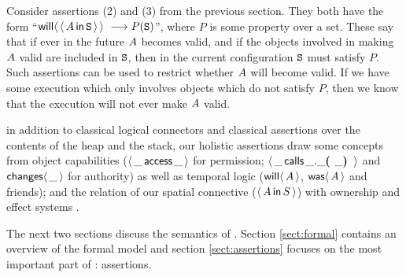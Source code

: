 Consider assertions (2) and (3) from the previous section. They
  both have the form ``$\Future {\Using {\A} {\SF}}\ \longrightarrow P(\SF)$'',
  where $P$ is some property over a set. These  say that if
  ever in the future $A$ becomes valid, and if the objects involved
  in making $A$ valid are included in ${{\mbox{\tt{S}}}}$, then in the current configuration ${{\mbox{\tt{S}}}}$ must satisfy
  $P$. Such assertions can be used to restrict whether $A$ will
  become valid. If we have some execution which only involves objects which do not satisfy $P$, then we know that the execution will not ever make $A$ valid.



 in addition to classical 
logical connectors and classical assertions over the contents of the heap and the stack, 
our holistic assertions draw some concepts from object capabilities
($\langle\, \_\, \mathsf{access}\, \_\, \rangle$  for  permission; $\langle\, \_\, \mathsf{calls}\, \_.\_{\mbox{\tt{\mbox{\tt{\bf{( }}}}}}\_{\mbox{\tt{\mbox{\tt{\bf{) }}}}}}\, \rangle$ and  ${\mathsf{changes}}\langle\,\_\,\rangle$ for
authority) 
as well as temporal logic (${\mathsf{will}}\langle \,A\,\rangle$, ${\mathsf{was}}\langle \,A\,\rangle$ and friends); and the relation of
our spatial connective ($\langle\, A\, \mathsf{in}\, S\, \rangle$)  with ownership and effect
systems \cite{typeEffect,ownalias,ownEncaps}.

The next two sections  discuss the semantics of \Chainmail. Section \ref{sect:formal}
contains an overview of the formal model and section \ref{sect:assertions} focuses on the most important part of \Chainmail : assertions.




